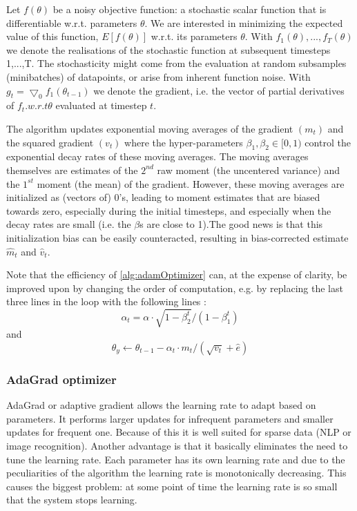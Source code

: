 Let $f(\theta)$ be  a  noisy  objective  function:  a  stochastic  scalar  function  that  is  differentiable  w.r.t. parameters $\theta$. We  are  interested in minimizing the expected value of this function, $E[f(\theta)]$ w.r.t. its parameters $\theta$. With $f_1(θ),...,f_T(θ)$ we  denote  the  realisations  of  the  stochastic  function  at  subsequent  timesteps 1,...,T. The stochasticity might come from the evaluation at random subsamples (minibatches) of datapoints, or arise from inherent function noise. With $g_t= \bigtriangledown_0 f_1 (\theta_{t-1})$ we denote the gradient, i.e. the vector of partial derivatives of $f_t.w.r.t \theta$ evaluated at timestep $t$. 

The algorithm updates exponential moving averages of the gradient $(m_t)$ and the squared gradient $(v_t)$ where the hyper-parameters $β_1,β_2 \in [0,1)$ control the exponential decay rates of these moving averages. The moving averages themselves are estimates of the $2^{nd}$ raw moment (the uncentered variance) and the $1^{st}$ moment (the mean) of the gradient.   However,  these moving averages are initialized as (vectors of) 0’s, leading to moment estimates that are biased towards zero, especially during the initial timesteps, and especially when the decay rates are small (i.e. the $\beta$s are close to 1).The good news is that this initialization bias can be easily counteracted, resulting in bias-corrected estimate $\widehat{m}_t$ and $\widehat{v}_t$.

Note that the efficiency of \ref{alg:adamOptimizer} can, at the expense of clarity, be improved upon by changing the order of computation, e.g.  by replacing the last three lines in the loop with the following lines \cite{Diederik}: $$\alpha_t = \alpha \cdot \sqrt{1 - \beta_2^t}/(1 - \beta_1^t)$$ and $$\theta_y \leftarrow \theta_{t-1} - \alpha_t \cdot m_t/(\sqrt{v_t} + \widehat{e})$$


\subsubsection{AdaGrad optimizer}

AdaGrad or adaptive gradient allows the learning rate to adapt based on parameters. It performs larger updates for infrequent parameters and smaller updates for frequent one. Because of this it is well suited for sparse data (NLP or image recognition). Another advantage is that it basically eliminates the need to tune the learning rate. Each parameter has its own learning rate and due to the peculiarities of the algorithm the learning rate is monotonically decreasing. This causes the biggest problem: at some point of time the learning rate is so small that the system stops learning.

